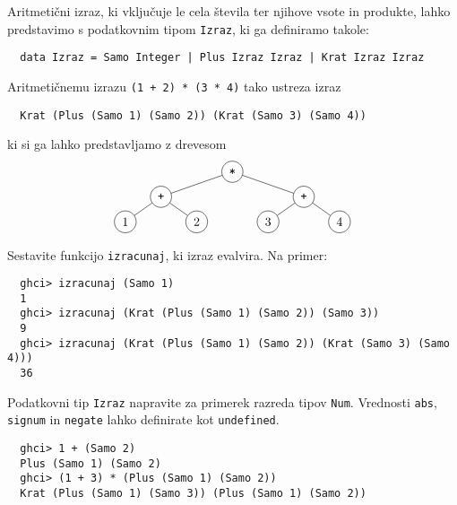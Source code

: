 \documentclass[arhiv]{../izpit}
\begin{document}


Aritmetični izraz, ki vključuje le cela števila ter njihove vsote in produkte,
lahko predstavimo s podatkovnim tipom \texttt{Izraz}, ki ga definiramo takole:
\begin{verbatim}
  data Izraz = Samo Integer | Plus Izraz Izraz | Krat Izraz Izraz
\end{verbatim}
Aritmetičnemu izrazu \texttt{(1 + 2) * (3 * 4)} tako ustreza izraz
\begin{verbatim}
  Krat (Plus (Samo 1) (Samo 2)) (Krat (Samo 3) (Samo 4))
\end{verbatim}
ki si ga lahko predstavljamo z drevesom
\[
  \begin{tikzpicture}[level distance=0.7cm,
    level 1/.style={sibling distance=4cm},
    level 2/.style={sibling distance=2cm},
    level 3/.style={sibling distance=2cm}
    ]
    \node[circle, draw] {\texttt{*}}
      child {node[circle, draw] {\texttt{+}}
        child {node[circle, draw] {1}}
        child {node[circle, draw] {2}}
      }
      child {node[circle, draw] {\texttt{+}}
        child {node[circle, draw] {3}}
        child {node[circle, draw] {4}}
      };
  \end{tikzpicture}
\]

\podnaloga
  Sestavite funkcijo \texttt{izracunaj}, ki izraz evalvira. Na primer:
  \begin{verbatim}
  ghci> izracunaj (Samo 1)
  1
  ghci> izracunaj (Krat (Plus (Samo 1) (Samo 2)) (Samo 3))
  9
  ghci> izracunaj (Krat (Plus (Samo 1) (Samo 2)) (Krat (Samo 3) (Samo 4)))
  36
  \end{verbatim}

\podnaloga
  Podatkovni tip \texttt{Izraz} napravite za primerek razreda tipov \texttt{Num}.
  Vrednosti \texttt{abs}, \texttt{signum} in \texttt{negate} lahko definirate kot \texttt{undefined}.
  \begin{verbatim}
  ghci> 1 + (Samo 2)
  Plus (Samo 1) (Samo 2)
  ghci> (1 + 3) * (Plus (Samo 1) (Samo 2))
  Krat (Plus (Samo 1) (Samo 3)) (Plus (Samo 1) (Samo 2))
  \end{verbatim}

\end{document}
